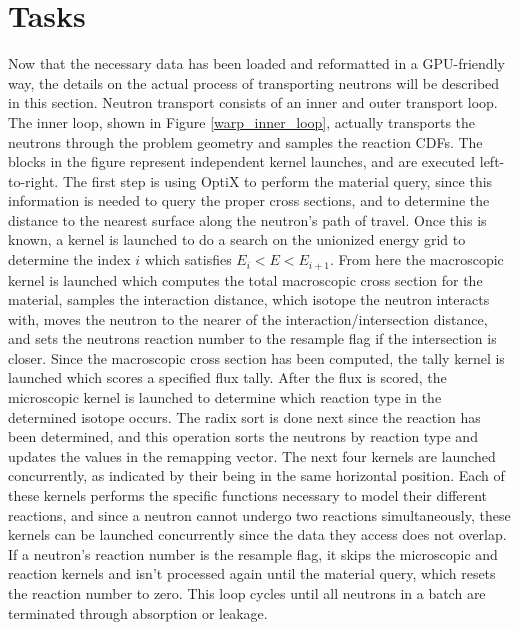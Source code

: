 
\section{Tasks}
\label{sec:tasks}

Now that the necessary data has been loaded and reformatted in a GPU-friendly way, the details on the actual process of transporting neutrons will be described in this section.  Neutron transport consists of an inner and outer transport loop.  The inner loop, shown in Figure \ref{warp_inner_loop}, actually transports the neutrons through the problem geometry and samples the reaction CDFs.  The blocks in the figure represent independent kernel launches, and are executed left-to-right.  The first step is using OptiX to perform the material query, since this information is needed to query the proper cross sections, and to determine the distance to the nearest surface along the neutron's path of travel.  Once this is known, a kernel is launched to do a search on the unionized energy grid to determine the index $i$ which satisfies $E_i<E<E_{i+1}$.  From here the macroscopic kernel is launched which computes the total macroscopic cross section for the material, samples the interaction distance, which isotope the neutron interacts with, moves the neutron to the nearer of the interaction/intersection distance, and sets the neutrons reaction number to the resample flag if the intersection is closer.  Since the macroscopic cross section has been computed, the tally kernel is launched which scores a specified flux tally.  After the flux is scored, the microscopic kernel is launched to determine which reaction type in the determined isotope occurs.  The radix sort is done next since the reaction has been determined, and this operation sorts the neutrons by reaction type and updates the values in the remapping vector.  The next four kernels are launched concurrently, as indicated by their being in the same horizontal position.  Each of these kernels performs the specific functions necessary to model their different reactions, and since a neutron cannot undergo two reactions simultaneously, these kernels can be launched concurrently since the data they access does not overlap.  If a neutron's reaction number is the resample flag, it skips the microscopic and reaction kernels and isn't processed again until the material query, which resets the reaction number to zero.   This loop cycles until all neutrons in a batch are terminated through absorption or leakage.  

